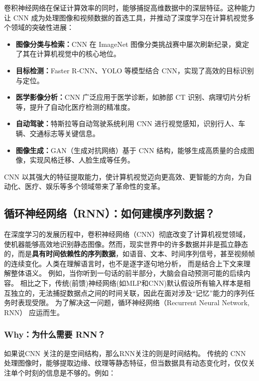 卷积神经网络在保证计算效率的同时，能够捕捉高维数据中的深层特征。这种能力让 CNN 成为处理图像和视频数据的首选工具，并推动了深度学习在计算机视觉多个领域的突破性进展：
\begin{itemize}
\item {\bf  图像分类与检索：}CNN 在 ImageNet 图像分类挑战赛中屡次刷新纪录，奠定了其在计算机视觉中的核心地位。
\item {\bf 目标检测：}Faster R-CNN、YOLO 等模型结合 CNN，实现了高效的目标识别与定位。
\item {\bf 医学影像分析：}CNN 广泛应用于医学诊断，如肺部 CT 识别、病理切片分析等，提升了自动化医疗检测的精准度。
\item {\bf 自动驾驶：}特斯拉等自动驾驶系统利用 CNN 进行视觉感知，识别行人、车辆、交通标志等关键信息。
\item {\bf 图像生成：}GAN（生成对抗网络）基于 CNN 结构，能够生成高质量的合成图像，实现风格迁移、人脸生成等任务。
\end{itemize}
CNN 以其强大的特征提取能力，使计算机视觉迈向更高效、更智能的方向，为自动化、医疗、娱乐等多个领域带来了革命性的变革。


 \subsection{循环神经网络（RNN）：如何建模序列数据？}
在深度学习的发展历程中，卷积神经网络（CNN）彻底改变了计算机视觉领域，使机器能够高效地识别静态图像。然而，现实世界中的许多数据并非是孤立静态的，而是{\bf 具有时间依赖性的序列数据}，如语音、文本、时间序列信号，甚至视频帧的连续变化。人类在理解语言时，也不是逐字逐句地分析， 而是结合上下文来理解整体语义。
例如，当你听到一句话的前半部分，大脑会自动预测可能的后续内容。
相比之下，传统(前馈)神经网络(如MLP和CNN)默认假设所有输入样本是相互独立的，无法捕捉数据点之间的时间关联，因此在面对涉及“记忆”能力的序列任务时表现受限。
为了解决这一问题，循环神经网络（Recurrent Neural Network, RNN） 应运而生。
 \subsubsection{ Why：为什么需要 RNN？}
如果说CNN 关注的是空间结构，那么RNN关注的则是时间结构。
传统的 CNN 处理图像时，能够提取边缘、纹理等静态特征，但当数据具有动态变化时，仅仅关注单个时刻的信息是不够的。例如：

